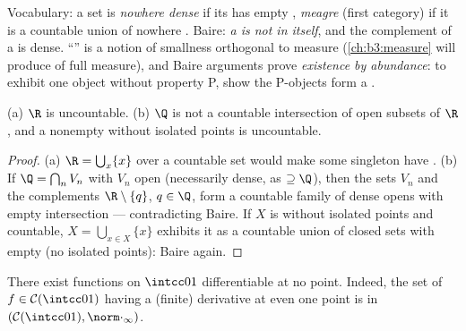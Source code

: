\begin{remark}\label{rem:b3:complete:meagre}
Vocabulary: a set is \emph{nowhere dense} if its  has
empty , \emph{meagre} (first category)
if it is a countable union of nowhere . Baire:
\emph{a  is not  in itself}, and the
complement of a  is dense. ``'' is a notion of
smallness orthogonal to measure (\cref{ch:b3:measure} will
produce  of full measure), and Baire arguments prove
\emph{existence by abundance}: to exhibit one object without
property P, show the P-objects form a .
\end{remark}

\begin{corollary}\label{cor:b3:complete:bairecors}
(a) $\R$ is uncountable. (b) $\Q$ is not a countable
intersection of open subsets of $\R$, and a nonempty  without isolated points is uncountable.
\end{corollary}

\begin{proof}
(a) $\R = \bigcup_{x}\{x\}$ over a countable set would make some
singleton have . (b) If $\Q = \bigcap_n V_n$ with $V_n$
open (necessarily dense, as $\supseteq \Q$), then the sets
$V_n$ and the complements $\R\setminus\{q\}$, $q \in \Q$, form a
countable family of dense opens with empty intersection ---
contradicting Baire. If $X$ is  without isolated points
and countable, $X = \bigcup_{x \in X}\{x\}$ exhibits it as a
countable union of closed sets with empty  (no isolated
points): Baire again.
\end{proof}

\begin{theorem}
\label{thm:b3:complete:nowherediff}
There exist  functions on $\intcc01$ differentiable at
no point. Indeed, the set of $f \in \mathcal C(\intcc01)$
having a (finite) derivative at even one point is  in
$(\mathcal C(\intcc01), \norm\cdot_\infty)$.
\end{theorem}


